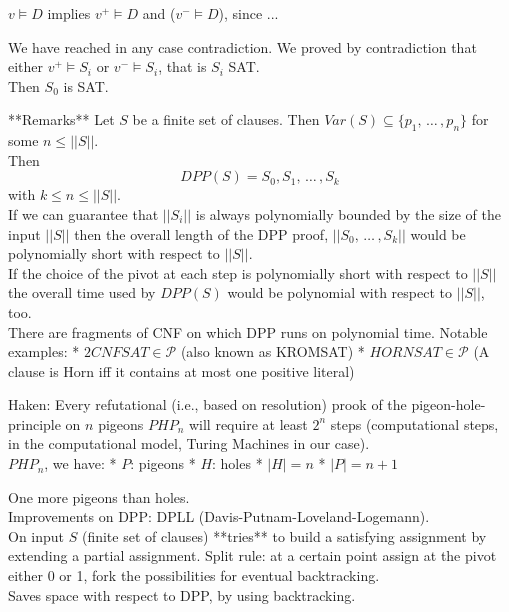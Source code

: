 $v \models D$ implies $v^+ \models D$ and ($v^- \models D$), since ...

We have reached in any case contradiction. We proved by contradiction that either $v^+ \models S_i$ or $v^- \models S_i$, that is $S_i$ SAT.\\

Then $S_0$ is SAT.


**Remarks**
Let $S$ be a finite set of clauses. Then $Var(S) \subseteq \{p_1, \, \dots \, , p_n\}$ for some $n \leq ||S||$.\\
Then 
$$DPP(S) = S_0, S_1, \, \dots \, , S_k
$$
with $k \leq n \leq ||S||$.\\

If we can guarantee that $||S_i||$ is always polynomially bounded by the size of the input $||S||$ then the overall length of the DPP proof, $||S_0, \, \dots \, , S_k||$ would be polynomially short with respect to $||S||$.\\

If the choice of the pivot at each step is polynomially short with respect to $||S||$ the overall time used by $DPP(S)$ would be polynomial with respect to $||S||$, too.\\

There are fragments of CNF on which DPP runs on polynomial time. Notable examples: 
* $2CNFSAT \in \mathcal{P}$ (also known as KROMSAT)
* $HORNSAT \in \mathcal{P}$ (A clause is Horn iff it contains at most one positive literal)


Haken: Every refutational (i.e., based on resolution) prook of the pigeon-hole-principle on $n$ pigeons $PHP_n$ will require at least $2^n$ steps (computational steps, in the computational model, Turing Machines in our case).\\

$PHP_n$, we have:
* $P$: pigeons
* $H$: holes
* $|H| = n$
* $|P| = n+1$

One more pigeons than holes.\\


Improvements on DPP: DPLL (Davis-Putnam-Loveland-Logemann).\\
On input $S$ (finite set of clauses) **tries** to build a satisfying assignment by extending a partial assignment. Split rule: at a certain point assign at the pivot either 0 or 1, fork the possibilities for eventual backtracking.\\
Saves space with respect to DPP, by using backtracking.\\

